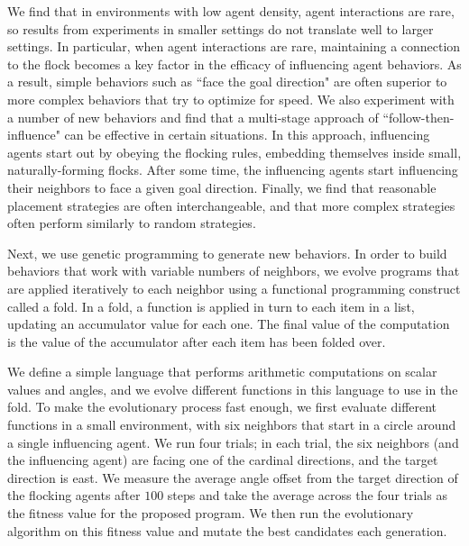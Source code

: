 
We find that in environments with low agent density, agent interactions are rare,
so results from experiments in smaller settings do not translate well to larger
settings.
In particular, when agent interactions are rare, maintaining a connection to
the flock becomes a key factor in the efficacy of influencing agent behaviors.
As a result, simple behaviors such as ``face the goal direction" are
often superior to more complex behaviors that try to optimize for speed.
We also experiment with a number of new behaviors and find that a multi-stage 
approach of ``follow-then-influence" can be effective in certain 
situations.
In this approach, influencing agents start out by obeying the flocking rules,
embedding themselves inside small, naturally-forming flocks.
After some time, the influencing agents start influencing their neighbors to
face a given goal direction.
Finally, we find that reasonable placement strategies are often 
interchangeable, and that more complex strategies often perform similarly to 
random strategies.

Next, we use genetic programming to generate new behaviors.
In order to build behaviors that work with variable numbers of neighbors, we
evolve programs that are applied iteratively to each neighbor using
a functional programming construct called a fold.
In a fold, a function is applied in turn to each item in a list, updating an
accumulator value for each one.
The final value of the computation is the value of the accumulator after each
item has been folded over.

We define a simple language that performs arithmetic computations
on scalar values and angles, and we evolve different functions in this language
to use in the fold.
To make the evolutionary process fast enough, we first evaluate different
functions in a small environment, with six neighbors that start in a circle
around a single influencing agent.
We run four trials; in each trial, the six neighbors (and the influencing agent)
are facing one of the cardinal directions, and the target direction is east.
We measure the average angle offset from the target direction of the flocking
agents after $100$ steps and take the average across the four trials as the
fitness value for the proposed program.
We then run the evolutionary algorithm on this fitness value and mutate the
best candidates each generation.


